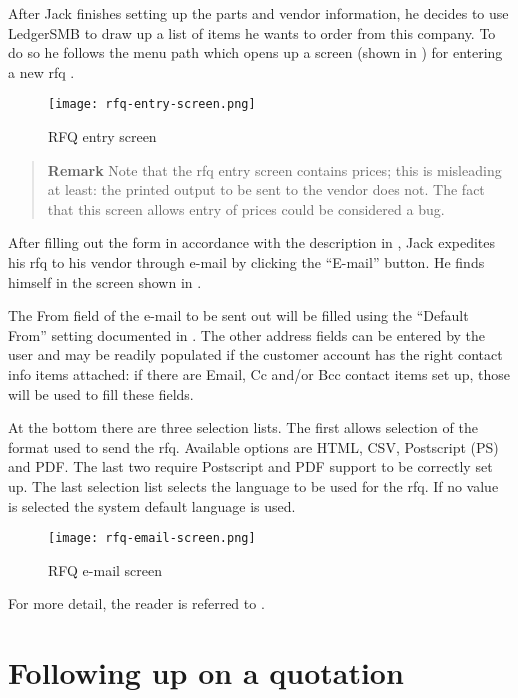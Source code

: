 After Jack finishes setting up the parts and vendor information, he decides to use LedgerSMB to draw
up a list of items he wants to order from this company. To do so he follows the menu path
 which opens up a screen (shown
in ) for entering a new \gls{rfq} .

\begin{figure}[h]
\centering
\texttt{[image: rfq-entry-screen.png]}
\caption{RFQ entry screen}
\label{fig:bus-rfq-entry-screen}
\end{figure}

\begin{quotation}
\textbf{Remark} Note that the \gls{rfq} entry screen contains prices; this is misleading
at least: the printed output to be sent to the vendor does not. The fact that this screen
allows entry of prices could be considered a bug.
\end{quotation}

After filling out the form in accordance with the description in ,
Jack expedites his \gls{rfq} to his vendor through e-mail by clicking the ``E-mail'' button. He finds
himself in the screen shown in .

The From field of the e-mail to be sent out will be filled using the ``Default From'' setting documented
in . The other address fields can be entered by the user and may be readily
populated if the customer account has the right contact info items attached: if there are Email, Cc and/or
Bcc contact items set up, those will be used to fill these fields.

At the bottom there are three selection lists. The first allows selection of the format used to send the
\gls{rfq}. Available options are HTML, CSV, Postscript (PS) and PDF. The last two require Postscript and PDF
support to be correctly set up. The last selection list selects the language to be used for the
\gls{rfq}. If no value is selected the system default language is used.

\begin{figure}[h]
\centering
\texttt{[image: rfq-email-screen.png]}
\caption{RFQ e-mail screen}
\label{fig:rfq-email-screen}
\end{figure}

For more detail, the reader is referred to .


\section{Following up on a quotation}
\label{sec-stock-quotation-followup}

